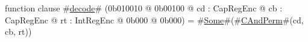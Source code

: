 function clause #\hyperref[sailMIPSzdecode]{decode}# (0b010010 @ 0b00100 @ cd : CapRegEnc @ cb : CapRegEnc @ rt : IntRegEnc @ 0b000 @ 0b000) = #\hyperref[sailMIPSzSome]{Some}#(#\hyperref[sailMIPSzCAndPerm]{CAndPerm}#(cd, cb, rt))
